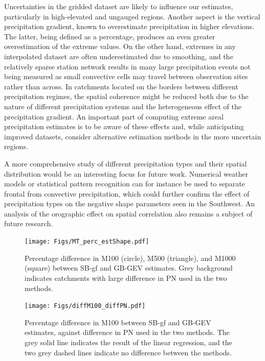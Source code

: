 \documentclass[12pt,a4paper,english]{article}
\begin{document}
Uncertainties in the gridded dataset are likely to influence our estimates, particularly in high-elevated and ungauged regions. Another aspect is the vertical precipitation gradient, known to overestimate precipitation in higher elevations. The latter, being defined as a percentage, produces an even greater overestimation of the extreme values. On the other hand, extremes in any interpolated dataset are often underestimated due to smoothing, and the relatively sparse station network results in many large precipitation events not being measured as small convective cells may travel between observation sites rather than across. In catchments located on the borders between different precipitation regimes, the spatial coherence might be reduced both due to the nature of different precipitation systems and the heterogeneous effect of the precipitation gradient. An important part of computing extreme areal precipitation estimates is to be aware of these effects and, while anticipating improved datasets, consider alternative estimation methods in the more uncertain regions.

A more comprehensive study of different precipitation types and their spatial distribution would be an interesting focus for future work. Numerical weather models or statistical pattern recognition \citep{Skaugen1997} can for instance be used to separate frontal from convective precipitation, which could further confirm the effect of precipitation types on the negative shape parameters seen in the Southwest. An analysis of the orographic effect on spatial correlation also remains a subject of future research.   

\begin{figure}[!htbp]
\begin{minipage}[t]{0.50\textwidth}
\centering
\texttt{[image: Figs/MT\_perc\_estShape.pdf]}   %
\vspace{-5mm}
\caption[]{\label{data:fig9}Percentage difference in M100 (circle), M500 (triangle), and M1000 (square) between SB-gf and GB-GEV estimates. Grey background indicates catchments with large difference in PN used in the two methods.}
\end{minipage}
\hspace{10mm}
\begin{minipage}[t]{0.50\textwidth}
\centering
\texttt{[image: Figs/diffM100\_diffPN.pdf]}
\caption[]{\label{data:fig10}Percentage difference in M100 between SB-gf and GB-GEV estimates, against difference in PN used in the two methods. The grey solid line indicates the result of the linear regression, and the two grey dashed lines indicate no difference between the methods.}
\end{minipage}
\end{figure}
\end{document}
